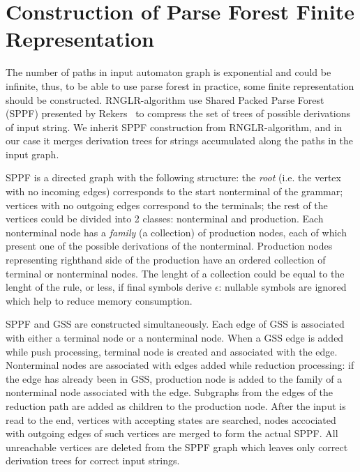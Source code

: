 \section{Construction of Parse Forest Finite Representation}
The number of paths in input automaton graph is exponential and could be infinite,
thus, to be able to use parse forest in practice, some finite representation should 
be constructed. RNGLR-algorithm use Shared Packed Parse Forest (SPPF) presented by 
Rekers~\cite{SPPF} to compress the set of trees of possible derivations of input string. 
We inherit SPPF construction from RNGLR-algorithm, and in our case it merges derivation
trees for strings accumulated along the paths in the input graph. 

SPPF is a directed graph with the following structure: the \emph{root} (i.e. the vertex
with no incoming edges) corresponds to the start nonterminal of the grammar; vertices 
with no outgoing edges correspond to the terminals; the rest of the vertices could be 
divided into 2 classes: nonterminal and production. Each nonterminal node has a 
\emph{family} (a collection) of production nodes, each of which present one of the 
possible derivations of the nonterminal. Production nodes representing righthand side 
of the production have an ordered collection of terminal or nonterminal nodes. The 
lenght of a collection could be equal to the lenght of the rule, or less, if final 
symbols derive $\epsilon$: nullable symbols are ignored which help to reduce memory 
consumption. 

SPPF and GSS are constructed simultaneously. Each edge of GSS is associated with either 
a terminal node or a nonterminal node. When a GSS edge is added while push processing, 
terminal node is created and associated with the edge. Nonterminal nodes are associated
with edges added while reduction processing: if the edge has already been in GSS, 
production node is added to the family of a nonterminal node associated with the edge.
Subgraphs from the edges of the reduction path are added as children to the production
node. After the input is read to the end, vertices with accepting states are searched,
nodes accociated with outgoing edges of such vertices are merged to form the actual
SPPF. All unreachable vertices are deleted from the SPPF graph which leaves only 
correct derivation trees for correct input strings.